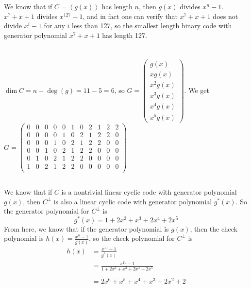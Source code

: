 \documentclass[11pt]{article}
\begin{document}
\section{} %
We know that if $C=\left\langle g(x)\right\rangle$ has length $n$, then $g(x)$ divides $x^n-1$.
$x^7+x+1$ divides $x^{127}-1$, and in fact one can verify that $x^7+x+1$ does not divide $x^i-1$ for any $i$ less than 127, so the smallest length binary code with generator polynomial $x^7+x+1$ has length 127.


\section{} %
\subsection{} %
$\dim C=n-\deg(g)=11-5=6$, so
$G=\begin{pmatrix}
	g(x)\\
	xg(x)\\
	x^2g(x)\\
	x^3g(x)\\
	x^4g(x)\\
	x^5g(x)
\end{pmatrix}$.
\newline
\newline
\newline
We get
\setcounter{MaxMatrixCols}{11}
$G=\begin{pmatrix}
	0 & 0 & 0 & 0 & 0 & 1 & 0 & 2 & 1 & 2 & 2\\
	0 & 0 & 0 & 0 & 1 & 0 & 2 & 1 & 2 & 2 & 0\\
	0 & 0 & 0 & 1 & 0 & 2 & 1 & 2 & 2 & 0 & 0\\
	0 & 0 & 1 & 0 & 2 & 1 & 2 & 2 & 0 & 0 & 0\\
	0 & 1 & 0 & 2 & 1 & 2 & 2 & 0 & 0 & 0 & 0\\
	1 & 0 & 2 & 1 & 2 & 2 & 0 & 0 & 0 & 0 & 0\\
\end{pmatrix}$


\subsection{} %
We know that if $C$ is a nontrivial linear cyclic code with generator polynomial $g(x)$, then $C^\perp$ is also a linear cyclic code with generator polynomial $g^*(x)$.
\newline
\newline
So the generator polynomial for $C^\perp$ is
\[g^*(x) = 1 + 2x^2 + x^3 + 2x^4 + 2x^5\]
From here, we know that if the generator polynomial is $g(x)$, then the check polynomial is $h(x)=\frac{x^n-1}{g(x)}$, so the check polynomial for $C^\perp$ is
\begin{align*}
	h(x) &= \frac{x^{11}-1}{g^*(x)}\\
		 &= \frac{x^{11}-1}{1 + 2x^2 + x^3 + 2x^4 + 2x^5}\\\\
		 &= 2x^6 + x^5 + x^4 + x^3 + 2x^2 + 2
\end{align*}
\end{document}
